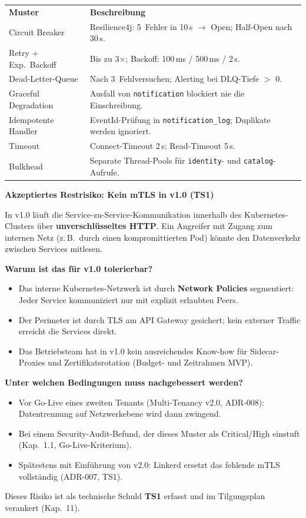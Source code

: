 \begin{tabularx}{\textwidth}{L{3.5cm} X}
  \color{white}\textbf{Muster} & \color{white}\textbf{Beschreibung} \\
  Circuit Breaker & Resilience4j: 5~Fehler in 10\,s $\to$ Open; Half-Open nach 30\,s. \\
  Retry + Exp.\ Backoff & Bis zu 3×; Backoff: 100\,ms / 500\,ms / 2\,s. \\
  Dead-Letter-Queue & Nach 3~Fehlversuchen; Alerting bei DLQ-Tiefe $>$ 0. \\
  Graceful Degradation & Ausfall von \texttt{notification} blockiert nie die Einschreibung. \\
  Idempotente Handler & EventId-Prüfung in \texttt{notification\_log}; Duplikate werden ignoriert. \\
  Timeout & Connect-Timeout 2\,s; Read-Timeout 5\,s. \\
  Bulkhead & Separate Thread-Pools für \texttt{identity}- und \texttt{catalog}-Aufrufe. \\
\end{tabularx}



\textbf{Akzeptiertes Restrisiko: Kein mTLS in v1.0 (TS1)}

In v1.0 läuft die Service-zu-Service-Kommunikation innerhalb des
Kubernetes-Clusters über \textbf{unverschlüsseltes HTTP}.
Ein Angreifer mit Zugang zum internen Netz (z.\,B.\ durch einen
kompromittierten Pod) könnte den Datenverkehr zwischen Services mitlesen.

\textbf{Warum ist das für v1.0 tolerierbar?}
\begin{itemize}[leftmargin=1.5em]
  \item Das interne Kubernetes-Netzwerk ist durch \textbf{Network Policies}
  segmentiert: Jeder Service kommuniziert nur mit explizit erlaubten Peers.
  \item Der Perimeter ist durch TLS am API Gateway gesichert;
  kein externer Traffic erreicht die Services direkt.
  \item Das Betriebsteam hat in v1.0 kein ausreichendes Know-how für
  Sidecar-Proxies und Zertifikatsrotation (Budget- und Zeitrahmen MVP).
\end{itemize}

\textbf{Unter welchen Bedingungen muss nachgebessert werden?}
\begin{itemize}[leftmargin=1.5em]
  \item Vor Go-Live eines zweiten Tenants (Multi-Tenancy v2.0, ADR-008):
  Datentrennung auf Netzwerkebene wird dann zwingend.
  \item Bei einem Security-Audit-Befund, der dieses Muster als
  Critical/High einstuft (Kap.~1.1, Go-Live-Kriterium).
  \item Spätestens mit Einführung von v2.0:
  Linkerd ersetzt das fehlende mTLS vollständig (ADR-007, TS1).
\end{itemize}
Dieses Risiko ist als technische Schuld \textbf{TS1} erfasst und im
Tilgungsplan verankert (Kap.~11).

